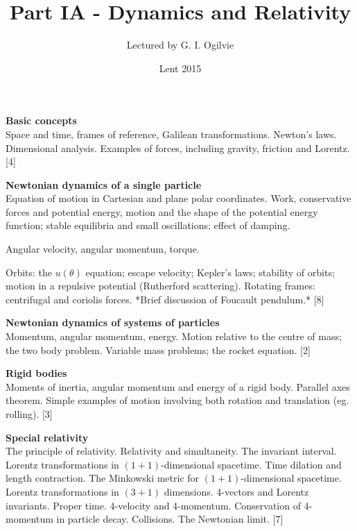 \documentclass[a4paper]{article}
\title{Part IA - Dynamics and Relativity}
\author{Lectured by G. I. Ogilvie}
\date{Lent 2015}
\begin{document}
\maketitle
{\small
\noindent\textbf{Basic concepts}\\
Space and time, frames of reference, Galilean transformations. Newton's laws. Dimensional analysis.  Examples of forces, including gravity, friction and Lorentz.\hspace*{\fill} [4]

\vspace{10pt}
\noindent\textbf{Newtonian dynamics of a single particle}\\
Equation of motion in Cartesian and plane polar coordinates. Work, conservative forces and potential energy, motion and the shape of the potential energy function; stable equilibria and small oscillations; effect of damping.

\vspace{5pt}
\noindent Angular velocity, angular momentum, torque.

\vspace{5pt}
\noindent Orbits: the $u(\theta)$ equation; escape velocity; Kepler's laws; stability of orbits; motion in a repulsive potential (Rutherford scattering). Rotating frames: centrifugal and coriolis forces. *Brief discussion of Foucault pendulum.*\hspace*{\fill} [8]

\vspace{10pt}
\noindent\textbf{Newtonian dynamics of systems of particles}\\
Momentum, angular momentum, energy. Motion relative to the centre of mass; the two body problem.  Variable mass problems; the rocket equation.\hspace*{\fill} [2]

\vspace{10pt}
\noindent\textbf{Rigid bodies}\\
Moments of inertia, angular momentum and energy of a rigid body. Parallel axes theorem. Simple examples of motion involving both rotation and translation (eg. rolling).\hspace*{\fill} [3]

\vspace{10pt}
\noindent\textbf{Special relativity}\\
The principle of relativity. Relativity and simultaneity. The invariant interval. Lorentz transformations in $(1 + 1)$-dimensional spacetime. Time dilation and length contraction. The Minkowski metric for $(1 + 1)$-dimensional spacetime. Lorentz transformations in $(3 + 1)$ dimensions. 4-vectors and Lorentz invariants. Proper time. 4-velocity and 4-momentum. Conservation of 4-momentum in particle decay. Collisions. The Newtonian limit.\hspace*{\fill} [7]}
\end{document}
